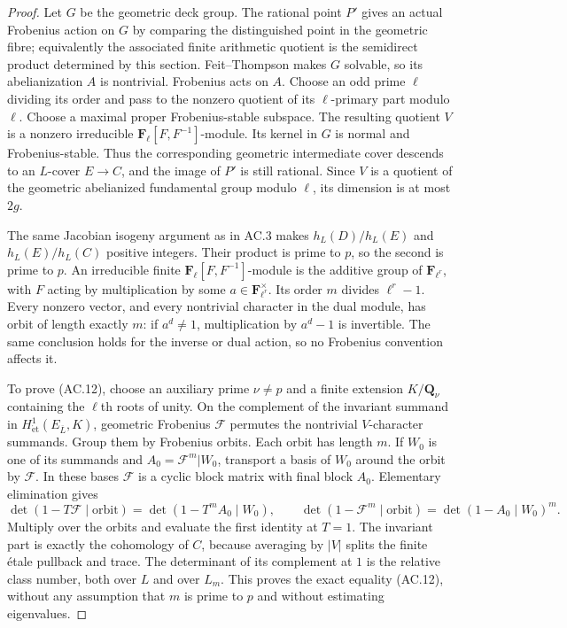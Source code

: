 \begin{proof}
Let $G$ be the geometric deck group.  The rational point $P'$ gives an
actual Frobenius action on $G$ by comparing the distinguished point in
the geometric fibre; equivalently the associated finite arithmetic
quotient is the semidirect product determined by this section.
Feit--Thompson makes $G$ solvable, so its abelianization $A$ is
nontrivial.  Frobenius acts on $A$.  Choose an odd prime $\ell$ dividing
its order and pass to the nonzero quotient of its $\ell$-primary part
modulo $\ell$.  Choose a maximal proper Frobenius-stable subspace.
The resulting quotient $V$ is a nonzero irreducible
$\mathbf F_\ell[F,F^{-1}]$-module.  Its kernel in $G$ is normal and
Frobenius-stable.  Thus the corresponding geometric intermediate cover
descends to an $L$-cover $E\to C$, and the image of $P'$ is still
rational.  Since $V$ is a quotient of the geometric abelianized
fundamental group modulo $\ell$, its dimension is at most $2g$.

The same Jacobian isogeny argument as in AC.3 makes
$h_L(D)/h_L(E)$ and $h_L(E)/h_L(C)$ positive integers.  Their product is
prime to $p$, so the second is prime to $p$.  An irreducible finite
$\mathbf F_\ell[F,F^{-1}]$-module is the additive group of
$\mathbf F_{\ell^r}$, with $F$ acting by multiplication by some
$a\in\mathbf F_{\ell^r}^{\times}$.  Its order $m$ divides
$\ell^r-1$.  Every nonzero vector, and every nontrivial character in
the dual module, has orbit of length exactly $m$: if $a^d\ne1$,
multiplication by $a^d-1$ is invertible.  The same conclusion holds for
the inverse or dual action, so no Frobenius convention affects it.

To prove (AC.12), choose an auxiliary prime $\nu\ne p$ and a finite
extension $K/\mathbf Q_\nu$ containing the $\ell$th roots of unity.
On the complement of the invariant summand in
$H^1_{\mathrm{\acute et}}(E_{\overline L},K)$, geometric Frobenius
$\mathcal F$ permutes the nontrivial $V$-character summands.  Group them
by Frobenius orbits.  Each orbit has length $m$.  If $W_0$ is one of
its summands and $A_0=\mathcal F^m|W_0$, transport a basis of $W_0$
around the orbit by $\mathcal F$.  In these bases $\mathcal F$ is a
cyclic block matrix with final block $A_0$.  Elementary elimination
gives
\[
 \det(1-T\mathcal F\mid\text{orbit})
       =\det(1-T^m A_0\mid W_0),\qquad
 \det(1-\mathcal F^m\mid\text{orbit})
       =\det(1-A_0\mid W_0)^m.
\]
Multiply over the orbits and evaluate the first identity at $T=1$.
The invariant part is exactly the cohomology of $C$, because averaging
by $|V|$ splits the finite \'etale pullback and trace.  The determinant
of its complement at $1$ is the relative class number, both over $L$
and over $L_m$.  This proves the exact equality (AC.12), without any
assumption that $m$ is prime to $p$ and without estimating eigenvalues.


\end{proof}
